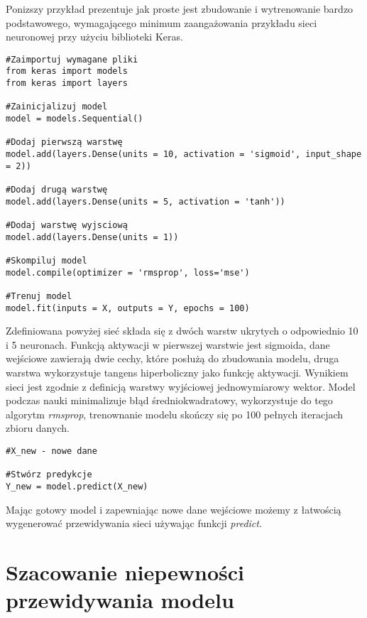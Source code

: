 \documentclass[11pt]{book}
\theoremstyle{definition}
\begin{document}
Ponizszy przykład prezentuje jak proste jest zbudowanie i wytrenowanie bardzo podstawowego, wymagającego minimum zaangażowania przykładu sieci neuronowej przy użyciu biblioteki Keras.


%
\begin{lstlisting}
#Zaimportuj wymagane pliki
from keras import models
from keras import layers

#Zainicjalizuj model
model = models.Sequential()

#Dodaj pierwszą warstwę
model.add(layers.Dense(units = 10, activation = 'sigmoid', input_shape = 2))

#Dodaj drugą warstwę
model.add(layers.Dense(units = 5, activation = 'tanh'))

#Dodaj warstwę wyjsciową
model.add(layers.Dense(units = 1))

#Skompiluj model
model.compile(optimizer = 'rmsprop', loss='mse')

#Trenuj model
model.fit(inputs = X, outputs = Y, epochs = 100)
\end{lstlisting}

Zdefiniowana powyżej sieć składa się z dwóch warstw ukrytych o odpowiednio 10 i 5 neuronach. Funkcją aktywacji w pierwszej warstwie jest sigmoida, dane wejściowe zawierają dwie cechy, które posłużą do zbudowania modelu, druga warstwa wykorzystuje tangens hiperboliczny jako funkcję aktywacji. Wynikiem sieci jest zgodnie z definicją warstwy wyjściowej jednowymiarowy wektor. Model podczas nauki minimalizuje błąd średniokwadratowy, wykorzystuje do tego algorytm \textit{rmsprop}, trenownanie modelu skończy się po 100 pełnych iteracjach zbioru danych.

\begin{lstlisting}
#X_new - nowe dane 

#Stwórz predykcje
Y_new = model.predict(X_new)
\end{lstlisting}

Mając gotowy model i zapewniając nowe dane wejściowe możemy z łatwością wygenerować przewidywania sieci używając funkcji \textit{predict}.


\section{Szacowanie niepewności przewidywania modelu}

\end{document}
